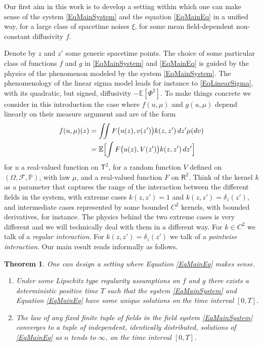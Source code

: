 \documentclass[10pt]{amsart}
\newenvironment{enumeratea}
{\bgroup\def\theenumi{\alph{enumi}}\begin{enumerate}}
{\end{enumerate}\egroup}
\newtheorem{thm}{Theorem}
\theoremstyle{definition}
\newcommand\bbE{\mathbb{E}}
\newcommand\bbR{\mathbf{\mathsf{R}}}
\newcommand{\bsfT}{\mathbf{\mathsf{T}}}
\newcommand{\mcF}{\mathcal{F}}
\newcommand{\bbP}{\mathbb{P}}
\begin{document}
Our first aim in this work is to develop a setting within which one can make sense of the system \eqref{EqMainSystem} and the equation \eqref{EqMainEq} in a unified way, for a large class of spacetime noises $\xi$, for some mean field-dependent non-constant diffusivity $f$.

Denote by $z$ and $z'$ some generic spacetime points. The choice of some particular class of functions $f$ and $g$ in \eqref{EqMainSystem} and \eqref{EqMainEq} is guided by the physics of the phenomenon modeled by the system \eqref{EqMainSystem}. The phenomenology of the linear sigma model leads for instance to \eqref{EqLinearSigma}, with its quadratic, but signed, diffusivity $-\bbE[\Phi^2]$. To make things concrete we consider in this introduction the case where $f(u,\mu)$ and $g(u,\mu)$ depend linearly on their measure argument and are of the form\vspace*{-3pt}
\begin{equation} \label{EqModelDiffusivity} \begin{aligned}
f(u,\mu)(z) &= \iint F\bigl(u(z), v(z')\bigr) k(z,z') \, dz' \mu(dv) \\
&= \bbE\Bigl[\int F\bigl(u(z),V(z')\bigr)k(z,z') \, dz'\Bigr]
\end{aligned} \end{equation}
for $u$ a real-valued function on $\bsfT^2$, for a random function $V$ defined on $(\Omega,\mcF,\bbP)$, with law $\mu$, and a real-valued function $F$ on $\bbR^2$. Think of the kernel $k$ as a parameter that captures the range of the interaction between the different fields in the system, with extreme cases $k(z,z')=1$ and $k(z,z')=\delta_z(z')$, and intermediate cases represented by some bounded $C^2$ kernels, with bounded derivatives, for instance. The physics behind the two extreme cases is very different and we will technically deal with them in a different way. For $k\in C^2$ we talk of a \emph{regular interaction}. For $k(z,z')=\delta_z(z')$ we talk of a \emph{pointwise interaction}. Our main result reads informally as follows.

\begin{thm} \label{ThmMainSketch}
One can design a setting where Equation \eqref{EqMainEq} makes sense.
\begin{enumeratea}
\item\label{ThmMainSketcha} Under some Lipschitz type regularity assumptions on $f$ and $g$ there exists a deterministic positive time $T$ such that the system \eqref{EqMainSystem} and Equation \eqref{EqMainEq} have some unique solutions on the time interval $[0,T]$.

\item\label{ThmMainSketchb}
The law of any fixed finite tuple of fields in the field system \eqref{EqMainSystem} converges to a tuple of independent, identically distributed, solutions of \eqref{EqMainEq} as $n$ tends to $\infty$, on the time interval $[0,T]$.
\end{enumeratea}
\end{thm}
\end{document}
